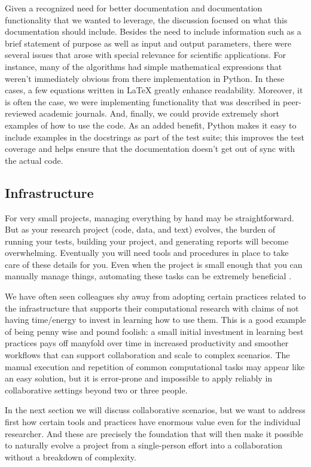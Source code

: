 \documentclass[ChapterTOCs,krantz2]{krantz} %
\begin{document}
Given a recognized need for better documentation and documentation
functionality that we wanted to leverage, the discussion focused on what this
documentation should include. Besides the need to include information such as a
brief statement of purpose as well as input and output parameters, there were
several issues that arose with special relevance for scientific applications.
For instance, many of the algorithms had simple mathematical expressions that
weren't immediately obvious from there implementation in Python. In these
cases, a few equations written in \LaTeX{} greatly enhance readability.
Moreover, it is often the case, we were implementing functionality that was
described in peer-reviewed academic journals. And, finally, we could provide
extremely short examples of how to use the code. As an added benefit, Python
makes it easy to include examples in the docstrings as part of the test suite;
this improves the test coverage and helps ensure that the documentation doesn't
get out of sync with the actual code.

\subsection{Infrastructure}

For very small projects, managing everything by hand may be straightforward.
But as your research project (code, data, and text) evolves, the burden of
running your tests, building your project, and generating reports will become
overwhelming. Eventually you will need tools and procedures in place to take
care of these details for you. Even when the project is small enough that you
can manually manage things, automating these tasks can be extremely beneficial
\cite{doar2005practical}.

We have often seen colleagues shy away from adopting certain practices related
to the infrastructure that supports their computational research with claims of
not having time/energy to invest in learning how to use them.  This is a good
example of being penny wise and pound foolish: a small initial investment in
learning best practices pays off manyfold over time in increased productivity
and smoother workflows that can support collaboration and scale to complex
scenarios.  The manual execution and repetition of common computational tasks
may appear like an easy solution, but it is error-prone and impossible to apply
reliably in collaborative settings beyond two or three people.

In the next section we will discuss collaborative scenarios, but we want to
address first how certain tools and practices have enormous value even for the
individual researcher.  And these are precisely the foundation that will then
make it possible to naturally evolve a project from a single-person effort into
a collaboration without a breakdown of complexity.
\end{document}
